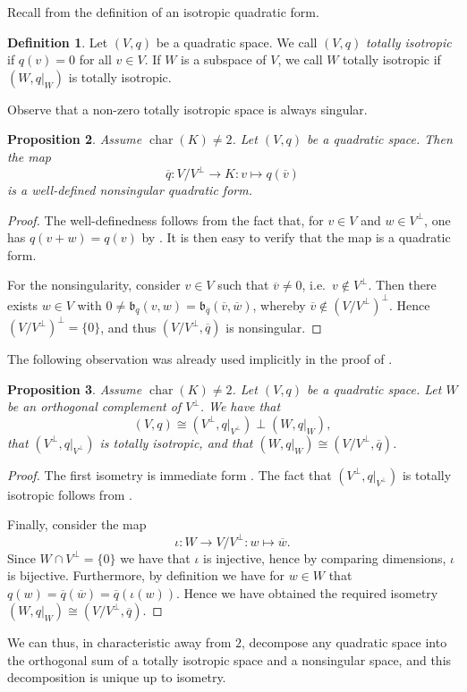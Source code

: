 \documentclass[12pt, leqno, british]{amsart}
\theoremstyle{definition}
\newtheorem{defi}{Definition}[subsection]
\theoremstyle{plain}
\newtheorem{prop}[defi]{Proposition}
\theoremstyle{remark}
\newcommand{\mf}{\mathfrak}
\newcommand{\ovl}{\overline}
\DeclareMathOperator{\charac}{char}
\begin{document}
Recall from  the definition of an isotropic quadratic form.
\begin{defi}
Let $(V, q)$ be a quadratic space.
We call $(V, q)$ \emph{totally isotropic} if $q(v) = 0$ for all $v \in V$.
If $W$ is a subspace of $V$, we call $W$ totally isotropic if $(W, q\vert_W)$ is totally isotropic.
\end{defi}
Observe that a non-zero totally isotropic space is always singular.
\begin{prop}\label{P:radical-residue}
Assume $\charac(K) \neq 2$. Let $(V, q)$ be a quadratic space.
Then the map
$$ \ovl{q} : V/V^\perp \to K : v \mapsto q(\ovl{v})$$
is a well-defined nonsingular quadratic form.
\end{prop}
\begin{proof}
The well-definedness follows from the fact that, for $v \in V$ and $w \in V^\perp$, one has $q(v + w) = q(v)$ by .
It is then easy to verify that the map is a quadratic form.

For the nonsingularity, consider $v \in V$ such that $\ovl{v} \neq 0$, i.e.~$v \not\in V^\perp$.
Then there exists $w \in V$ with $0 \neq \mf{b}_q(v, w) = \mf{b}_{\ovl{q}}(\ovl{v}, \ovl{w})$, whereby $\ovl{v} \not\in (V/V^\perp)^\perp$.
Hence $(V/V^\perp)^\perp = \lbrace 0 \rbrace$, and thus $(V/V^\perp, \ovl{q})$ is nonsingular.
\end{proof}

The following observation was already used implicitly in the proof of .
\begin{prop}\label{P:decomposition-totally-isotropic}
Assume $\charac(K) \neq 2$.
Let $(V, q)$ be a quadratic space.
Let $W$ be an orthogonal complement of $V^\perp$.
We have that $$(V, q) \cong (V^\perp, q\vert_{V^\perp}) \perp (W, q\vert_W),$$ that $(V^\perp, q\vert_{V^\perp})$ is totally isotropic, and that $(W, q\vert_W) \cong (V/V^\perp, \ovl{q})$.
\end{prop}
\begin{proof}
The first isometry is immediate form .
The fact that $(V^\perp, q\vert_{V^\perp})$ is totally isotropic follows from .

Finally, consider the map
$$ \iota : W \to V/V^\perp : w \mapsto \ovl{w}.$$
Since $W \cap V^\perp = \lbrace 0 \rbrace$ we have that $\iota$ is injective, hence by comparing dimensions, $\iota$ is bijective.
Furthermore, by definition we have for $w \in W$ that $q(w) = \ovl{q}(\ovl{w}) = \ovl{q}(\iota(w))$.
Hence we have obtained the required isometry $(W, q\vert_W) \cong (V/V^\perp, \ovl{q})$.
\end{proof}
We can thus, in characteristic away from $2$, decompose any quadratic space into the orthogonal sum of a totally isotropic space and a nonsingular space, and this decomposition is unique up to isometry.
\end{document}
